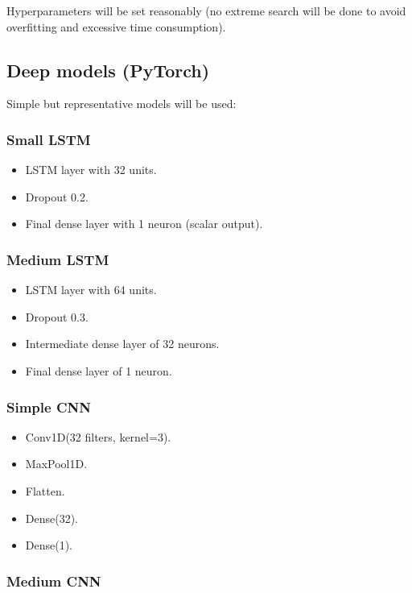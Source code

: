 \documentclass[12pt]{article}
\begin{document}
Hyperparameters will be set reasonably (no extreme search will be done to avoid overfitting and excessive time consumption).

\subsection{Deep models (PyTorch)}

Simple but representative models will be used:

\subsubsection{Small LSTM}

\begin{itemize}
    \item LSTM layer with 32 units.
    \item Dropout 0.2.
    \item Final dense layer with 1 neuron (scalar output).
\end{itemize}

\subsubsection{Medium LSTM}

\begin{itemize}
    \item LSTM layer with 64 units.
    \item Dropout 0.3.
    \item Intermediate dense layer of 32 neurons.
    \item Final dense layer of 1 neuron.
\end{itemize}

\subsubsection{Simple CNN}

\begin{itemize}
    \item Conv1D(32 filters, kernel=3).
    \item MaxPool1D.
    \item Flatten.
    \item Dense(32).
    \item Dense(1).
\end{itemize}

\subsubsection{Medium CNN}
\end{document}

